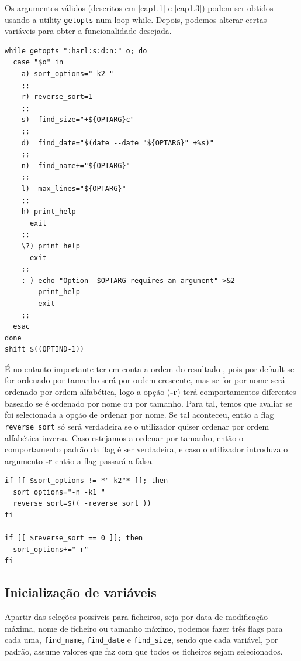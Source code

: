    Os argumentos válidos (descritos em \ref{cap1.1} e
   \ref{cap1.3}) podem ser obtidos usando a utility
   \verb|getopts| num loop while. Depois, podemos alterar
   certas variáveis para obter a funcionalidade desejada.

\begin{listing}[H]
\begin{verbatim}
while getopts ":harl:s:d:n:" o; do 
  case "$o" in
    a) sort_options="-k2 "
    ;;
    r) reverse_sort=1
    ;;
    s)  find_size="+${OPTARG}c"
    ;;
    d)  find_date="$(date --date "${OPTARG}" +%s)"
    ;;
    n)  find_name+="${OPTARG}"
    ;;
    l)  max_lines="${OPTARG}"
    ;;
    h) print_help
      exit
    ;;
    \?) print_help
      exit
    ;;
    : ) echo "Option -$OPTARG requires an argument" >&2
        print_help
        exit
    ;;
  esac
done
shift $((OPTIND-1))
\end{verbatim}
\end{listing}

É no entanto importante ter em conta a ordem do resultado
, pois por default se for ordenado por tamanho
será por ordem crescente, mas se for por nome será ordenado
por ordem alfabética, logo a opção (\textbf{-r}) terá
comportamentos diferentes baseado se é ordenado por nome ou
por tamanho.
Para tal, temos que avaliar se foi selecionada a opção de
ordenar por nome. Se tal aconteceu, então a flag
\verb|reverse_sort| só será verdadeira se o utilizador quiser
ordenar por ordem alfabética inversa. Caso estejamos a
ordenar por tamanho, então o comportamento padrão da flag é
ser verdadeira, e caso o utilizador introduza o argumento
\textbf{-r} então a flag passará a falsa.
\begin{listing}[H]
\begin{verbatim}
if [[ $sort_options != *"-k2"* ]]; then
  sort_options="-n -k1 "
  reverse_sort=$(( -reverse_sort ))
fi

if [[ $reverse_sort == 0 ]]; then
  sort_options+="-r"
fi
\end{verbatim}
\end{listing}

\subsection{Inicialização de variáveis}
Apartir das seleções possíveis para ficheiros, seja por data
de modificação máxima, nome de ficheiro ou tamanho máximo,
podemos fazer três flags para cada uma, \verb|find_name|,
\verb|find_date| e \verb|find_size|, sendo que cada
variável, por padrão, assume valores que faz com que todos
os ficheiros sejam selecionados.

